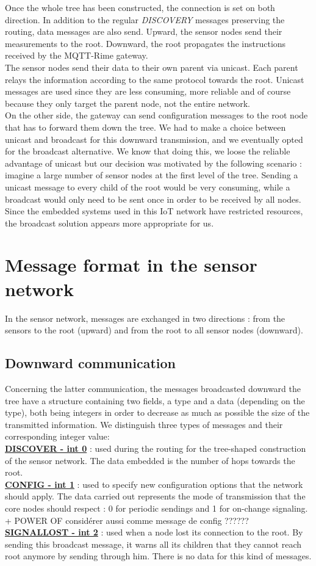 \documentclass{article}
\begin{document}
Once the whole tree has been constructed, the connection is set on both direction. In addition to the regular \textit{DISCOVERY} messages preserving the routing, data messages are also send. Upward, the sensor nodes send their measurements to the root. Downward, the root propagates the instructions received by the MQTT-Rime gateway.\\
The sensor nodes send their data to their own parent via unicast. Each parent relays the information according to the same protocol towards the root. Unicast messages are used since they are less consuming, more reliable and of course because they only target the parent node, not the entire network. 
\\
On the other side, the gateway can send configuration messages to the root node that has to forward them down the tree. We had to make a choice between unicast and broadcast for this downward transmission, and we eventually opted for the broadcast alternative. We know that doing this, we loose the reliable advantage of unicast but our decision was motivated by the following scenario : imagine a large number of sensor nodes at the first level of the tree. Sending a unicast message to every child of the root would be very consuming, while a broadcast would only need to be sent once in order to be received by all nodes. Since the embedded systems used in this IoT network have restricted resources, the broadcast solution appears more appropriate for us.


\section{Message format in the sensor network}

In the sensor network, messages are exchanged in two directions : from the sensors to the root (upward) and from the root to all sensor nodes (downward).
\subsection{Downward communication}
Concerning the latter communication, the messages broadcasted downward the tree have a structure containing two fields, a type and a data (depending on the type), both being integers in order to decrease as much as possible the size of the transmitted information. We distinguish three types of messages and their corresponding integer value: \\
\underline{\textbf{DISCOVER - int 0}} : used during the routing for the tree-shaped construction of the sensor network. The data embedded is the number of hops towards the root. \\
\underline{\textbf{CONFIG - int 1}} : used to specify new configuration options that the network should apply. The data carried out represents the mode of transmission that the core nodes should respect : 0 for periodic sendings and 1 for on-change signaling.  + POWER OF considérer aussi comme message de config ??????\\
\underline{\textbf{SIGNALLOST - int 2}} : used when a node lost its connection to the root. By sending this broadcast message, it warns all its children that they cannot reach root anymore by sending through him. There is no data for this kind of messages.
\end{document}
